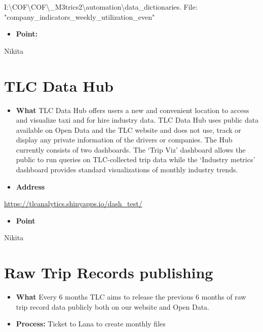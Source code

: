 \documentclass[
]{book}
\newenvironment{Shaded}{\begin{snugshade}}{\end{snugshade}}
\newcommand{\NormalTok}[1]{#1}
\newcommand{\SpecialCharTok}[1]{\textcolor[rgb]{0.00,0.00,0.00}{#1}}
\newcommand{\StringTok}[1]{\textcolor[rgb]{0.31,0.60,0.02}{#1}}
\providecommand{\tightlist}{%
  \setlength{\itemsep}{0pt}\setlength{\parskip}{0pt}}
\begin{document}
\begin{Shaded}
\begin{Highlighting}[]
\NormalTok{I}\SpecialCharTok{:}\NormalTok{\textbackslash{}COF\textbackslash{}COF\textbackslash{}\_M3trics2\textbackslash{}automation\textbackslash{}data\_dictionaries. File}\SpecialCharTok{:} \StringTok{"company\_indicators\_weekly\_utilization\_even"}
\end{Highlighting}
\end{Shaded}

\begin{itemize}
\tightlist
\item
  \textbf{Point:}
\end{itemize}

Nikita

\hypertarget{tlc-data-hub}{%
\section{TLC Data Hub}\label{tlc-data-hub}}

\begin{itemize}
\item
  \textbf{What}
  TLC Data Hub offers users a new and convenient location to access and visualize taxi and for hire industry data. TLC Data Hub uses public data available on Open Data and the TLC website and does not use, track or display any private information of the drivers or companies. The Hub currently consists of two dashboards. The `Trip Viz' dashboard allows the public to run queries on TLC-collected trip data while the `Industry metrics' dashboard provides standard visualizations of monthly industry trends.
\item
  \textbf{Address}
\end{itemize}

\url{https://tlcanalytics.shinyapps.io/dash_test/}

\begin{itemize}
\tightlist
\item
  \textbf{Point}
\end{itemize}

Nikita

\hypertarget{raw-trip-records-publishing}{%
\section{Raw Trip Records publishing}\label{raw-trip-records-publishing}}

\begin{itemize}
\item
  \textbf{What}
  Every 6 months TLC aims to release the previous 6 months of raw trip record data publicly both on our website and Open Data.
\item
  \textbf{Process:}
  Ticket to Lana to create monthly files
\end{itemize}
\end{document}
